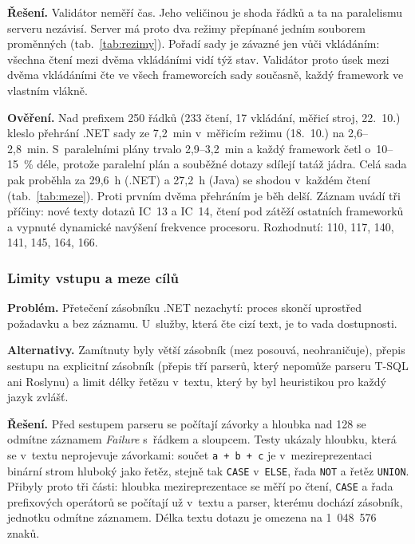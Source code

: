 \textbf{Řešení.} Validátor neměří čas. Jeho veličinou je shoda řádků a ta na paralelismu serveru nezávisí. Server má proto dva režimy přepínané jedním souborem proměnných (tab.~\ref{tab:rezimy}). Pořadí sady je závazné jen vůči vkládáním: všechna čtení mezi dvěma vkládáními vidí týž stav. Validátor proto úsek mezi dvěma vkládáními čte ve všech frameworcích sady současně, každý framework ve vlastním vlákně.

\textbf{Ověření.} Nad prefixem 250 řádků (233 čtení, 17 vkládání, měřicí stroj, 22.~10.) kleslo přehrání .NET sady ze 7,2~min v~měřicím režimu (18.~10.) na 2,6--2,8~min. S~paralelními plány trvalo 2,9--3,2~min a každý framework četl o~10--15~\% déle, protože paralelní plán a souběžné dotazy sdílejí tatáž jádra. Celá sada pak proběhla za 29,6~h (.NET) a 27,2~h (Java) se shodou v~každém čtení (tab.~\ref{tab:meze}). Proti prvním dvěma přehráním je běh delší. Záznam uvádí tři příčiny: nové texty dotazů IC~13 a IC~14, čtení pod zátěží ostatních frameworků a vypnuté dynamické navýšení frekvence procesoru. Rozhodnutí: 110, 117, 140, 141, 145, 164, 166.

\subsubsection*{Limity vstupu a meze cílů}

\textbf{Problém.} Přetečení zásobníku .NET nezachytí: proces skončí uprostřed požadavku a bez záznamu. U~služby, která čte cizí text, je to vada dostupnosti.

\textbf{Alternativy.} Zamítnuty byly větší zásobník (mez posouvá, neohraničuje), přepis sestupu na explicitní zásobník (přepis tří parserů, který nepomůže parseru T-SQL ani Roslynu) a limit délky řetězu v~textu, který by byl heuristikou pro každý jazyk zvlášť.

\textbf{Řešení.} Před sestupem parseru se počítají závorky a hloubka nad 128 se odmítne záznamem \emph{Failure} s~řádkem a sloupcem. Testy ukázaly hloubku, která se v~textu neprojevuje závorkami: součet \texttt{a + b + c} je v~mezireprezentaci binární strom hluboký jako řetěz, stejně tak \texttt{CASE} v~\texttt{ELSE}, řada \texttt{NOT} a řetěz \texttt{UNION}. Přibyly proto tři části: hloubka mezireprezentace se měří po čtení, \texttt{CASE} a řada prefixových operátorů se počítají už v~textu a parser, kterému dochází zásobník, jednotku odmítne záznamem. Délka textu dotazu je omezena na 1~048~576 znaků.

